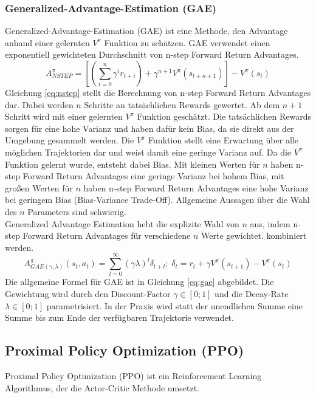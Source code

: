 \subsubsection{Generalized-Advantage-Estimation (GAE)}
Generalized-Advantage-Estimation (GAE) ist eine Methode, den Advantage anhand einer gelernten $V^\pi$ Funktion zu schätzen. GAE verwendet einen exponentiell gewichteten Durchschnitt von n-step Forward Return Advantages.
\begin{equation}
    A^\pi_{NSTEP} = \left[ (\sum_{i=0}^n \gamma^i r_{t+i}) + \gamma^{n+1} V^\pi (s_{t+n+1}) \right] - V^\pi(s_t)
    \label{eq:nstep}
\end{equation}
Gleichung \ref{eq:nstep} stellt die Berechnung von n-step Forward Return Advantages dar. Dabei werden $n$ Schritte an tatsächlichen Rewards gewertet. Ab dem $n+1$ Schritt wird mit einer gelernten $V^\pi$ Funktion geschätzt. Die tatsächlichen Rewards sorgen für eine hohe Varianz und haben dafür kein Bias, da sie direkt aus der Umgebung gesammelt werden. Die $V^\pi$ Funktion stellt eine Erwartung über alle möglichen Trajektorien dar und weist damit eine geringe Varianz auf. Da die $V^\pi$ Funktion gelernt wurde, entsteht dabei Bias. Mit kleinen Werten für $n$ haben n-step Forward Return Advantages eine geringe Varianz bei hohem Bias, mit großen Werten für $n$ haben n-step Forward Return Advantages eine hohe Varianz bei geringem Bias (Bias-Variance Trade-Off). Allgemeine Aussagen über die Wahl des $n$ Parameters sind schwierig.\\
Generalized Advantage Estimation hebt die explizite Wahl von $n$ aus, indem n-step Forward Return Advantages für verschiedene $n$ Werte gewichtet. kombiniert werden.
\begin{equation}
    A^\pi_{GAE(\gamma,\lambda)} (s_t,a_t) = \sum_{l=0}^\infty (\gamma\lambda)^l \delta_{t+l} ;\; \delta_t = r_t + \gamma V^\pi (s_{t+1}) - V^\pi(s_t)
    \label{eq:gae}
\end{equation}
Die allgemeine Formel für GAE ist in Gleichung \ref{eq:gae} abgebildet. Die Gewichtung wird durch den Discount-Factor $\gamma \in [0;1]$ und die Decay-Rate $\lambda \in [0;1]$ parametrisiert.
In der Praxis wird statt der unendlichen Summe eine Summe bis zum Ende der verfügbaren Trajektorie verwendet. \cite{gaePaper}


\subsection{Proximal Policy Optimization (PPO)}
Proximal Policy Optimization (PPO) ist ein Reinforcement Learning Algorithmus, der die Actor-Critic Methode umsetzt.

